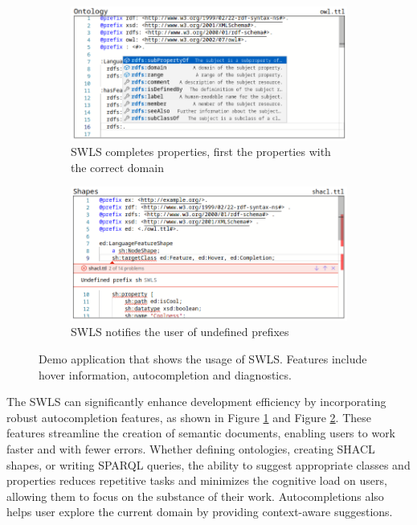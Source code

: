 \begin{figure}[tb]
\begin{subfigure}{0.48\textwidth}
      \label{class_completion}
    \end{subfigure}
    \hfill
    \begin{subfigure}{0.48\textwidth}
      \includegraphics[width=\textwidth]{./images/property.png}
      \caption{SWLS completes properties, first the properties with the correct domain}
      \label{property_completion}
    \end{subfigure}
    \hfill
    \begin{subfigure}{0.48\textwidth}
      \includegraphics[width=\textwidth]{./images/undefined.png}
      \caption{SWLS notifies the user of undefined prefixes}
      \label{undefined_prefix}
    \end{subfigure}
    \caption{
      Demo application that shows the usage of SWLS. Features include hover information, autocompletion and diagnostics.
    }\label{lst:Demo}
\end{figure}

The SWLS can significantly enhance development efficiency by incorporating robust autocompletion features, as shown in Figure \ref{class_completion} and Figure \ref{property_completion}.
These features streamline the creation of semantic documents, enabling users to work faster and with fewer errors. 
Whether defining ontologies, creating SHACL shapes, or writing SPARQL queries, the ability to suggest appropriate classes and properties reduces repetitive tasks and minimizes the cognitive load on users, allowing them to focus on the substance of their work.
Autocompletions also helps user explore the current domain by providing context-aware suggestions.

